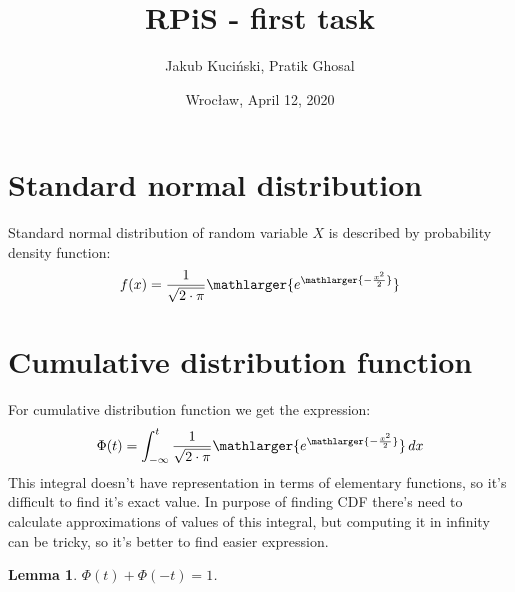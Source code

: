 \documentclass[11pt,wide]{article}
\title{RPiS - first task}
\date{Wrocław, April 12, 2020}
\author{Jakub Kuciński, Pratik Ghosal}
\newtheorem{lemma}{Lemma}
\begin{document}
\maketitle
\thispagestyle{empty} 
\tableofcontents


\section{Standard normal distribution}
Standard normal distribution of random variable $X$ is described by probability density function:
\begin{equation}
\displaystyle f(x) = \frac{1}{\sqrt{2 \cdot \pi}} \mathlarger{e^{\mathlarger{-\frac{x^2}{2}}}}
\end{equation}


\section{Cumulative distribution function}
For cumulative distribution function we get the expression:
\begin{equation}
\displaystyle \Phi (t) = \int_{-\infty}^t \frac{1}{\sqrt{2 \cdot \pi}} \mathlarger{e^{\mathlarger{-\frac{x^2}{2}}}} \mathop{dx} 
\end{equation}
This integral doesn't have representation in terms of elementary functions, so it's difficult to find it's exact value. In purpose of finding CDF there's need to calculate approximations of values of this integral, but computing it in infinity can be tricky, so it's better to find easier expression.

\begin{lemma}
\(\Phi (t) + \Phi (-t) = 1\).
\end{lemma}
\end{document}
